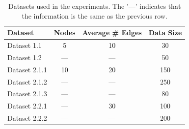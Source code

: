 \documentclass{lxaiproposal}
\begin{document}
    \begin{table}[h]
        \centering
        \begin{tabular}{|l|c|c|c|}
            \hline
            \textbf{Dataset} & \textbf{Nodes} & \textbf{Average \# Edges} & \textbf{Data Size} \\
            \hline
            Dataset 1.1      & 5              & 10                        & 30                 \\
            Dataset 1.2      & ---            & ---                       & 50                 \\
            \hline
            Dataset 2.1.1    & 10             & 20                        & 150                \\
            Dataset 2.1.2    & ---            & ---                       & 250                \\
            Dataset 2.1.3    & ---            & ---                       & 80                 \\
            \hline
            Dataset 2.2.1    & ---            & 30                        & 100                \\
            Dataset 2.2.2    & ---            & ---                       & 200                \\

            \hline
        \end{tabular}
        \caption{Datasets used in the experiments. The '---' indicates that the information is the same as the previous
        row.}
        \label{tab:datasets}
    \end{table}
\end{document}
